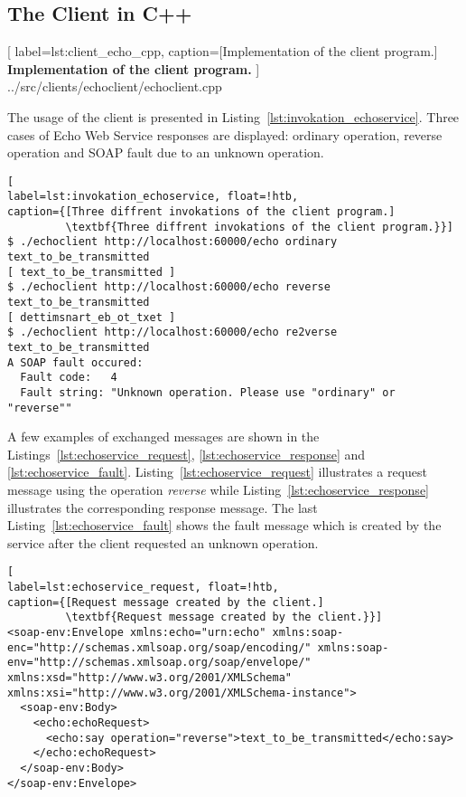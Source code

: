 \subsection{The Client in C++}


	[
	label=lst:client_echo_cpp,
	caption={[Implementation of the client program.]
	\textbf{Implementation of the client program.}}
	]
{../src/clients/echoclient/echoclient.cpp}


The usage of the client is presented in Listing~\ref{lst:invokation_echoservice}.
Three cases of Echo Web Service responses are displayed: ordinary operation, reverse operation and SOAP fault due to an unknown operation.


\begin{lstlisting}[
label=lst:invokation_echoservice, float=!htb,
caption={[Three diffrent invokations of the client program.]
         \textbf{Three diffrent invokations of the client program.}}]
$ ./echoclient http://localhost:60000/echo ordinary text_to_be_transmitted
[ text_to_be_transmitted ]
$ ./echoclient http://localhost:60000/echo reverse text_to_be_transmitted
[ dettimsnart_eb_ot_txet ]
$ ./echoclient http://localhost:60000/echo re2verse text_to_be_transmitted
A SOAP fault occured:
  Fault code:   4
  Fault string: "Unknown operation. Please use "ordinary" or "reverse""
\end{lstlisting}

A few examples of exchanged messages are shown in the Listings~\ref{lst:echoservice_request}, \ref{lst:echoservice_response} and \ref{lst:echoservice_fault}. Listing~\ref{lst:echoservice_request} illustrates a request message using the operation \textit{reverse} while Listing~\ref{lst:echoservice_response} illustrates the corresponding response message.
The last Listing~\ref{lst:echoservice_fault} shows the fault message which is created by the service after the client requested an unknown operation.

\begin{lstlisting}[
label=lst:echoservice_request, float=!htb,
caption={[Request message created by the client.]
         \textbf{Request message created by the client.}}]
<soap-env:Envelope xmlns:echo="urn:echo" xmlns:soap-enc="http://schemas.xmlsoap.org/soap/encoding/" xmlns:soap-env="http://schemas.xmlsoap.org/soap/envelope/" xmlns:xsd="http://www.w3.org/2001/XMLSchema" xmlns:xsi="http://www.w3.org/2001/XMLSchema-instance">
  <soap-env:Body>
    <echo:echoRequest>
      <echo:say operation="reverse">text_to_be_transmitted</echo:say>
    </echo:echoRequest>
  </soap-env:Body>
</soap-env:Envelope>
\end{lstlisting}



